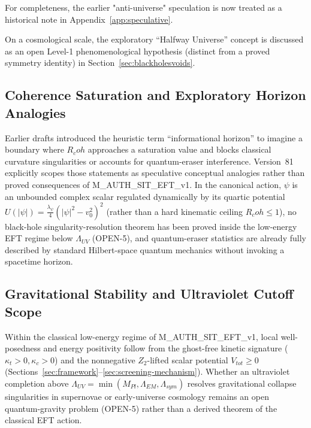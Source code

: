 \documentclass[american,11pt,letterpaper]{article}
\newcommand{\Rcoh}{R_{\mathrm{coh}}}
\def\mathrm#1{#1}%
\def\texttt#1{#1}%
\def\Rcoh{R_coh}%
\begin{document}
For completeness, the earlier "anti-universe" speculation is now treated as a historical note in Appendix~\ref{app:speculative}.

On a cosmological scale, the exploratory ``Halfway Universe'' concept is discussed as an open Level-1 phenomenological hypothesis (distinct from a proved symmetry identity) in Section~\ref{sec:blackholesvoids}.

\subsection{Coherence Saturation and Exploratory Horizon Analogies}
\label{sec:info-horizons}

Earlier drafts introduced the heuristic term ``informational horizon'' to imagine a boundary where $\Rcoh$ approaches a saturation value and blocks classical curvature singularities or accounts for quantum-eraser interference. Version~81 explicitly scopes those statements as speculative conceptual analogies rather than proved consequences of \texttt{M\_AUTH\_SIT\_EFT\_v1}. In the canonical action, $\psi$ is an unbounded complex scalar regulated dynamically by its quartic potential $U(|\psi|) = \frac{\lambda_\psi}{4}(|\psi|^2 - v_0^2)^2$ (rather than a hard kinematic ceiling $\Rcoh \le 1$), no black-hole singularity-resolution theorem has been proved inside the low-energy EFT regime below $\Lambda_{\mathrm{UV}}$ (\texttt{OPEN-5}), and quantum-eraser statistics are already fully described by standard Hilbert-space quantum mechanics without invoking a spacetime horizon.

\subsection{Gravitational Stability and Ultraviolet Cutoff Scope}
\label{sec:grav-stability}

Within the classical low-energy regime of \texttt{M\_AUTH\_SIT\_EFT\_v1}, local well-posedness and energy positivity follow from the ghost-free kinetic signature ($\kappa_t > 0, \kappa_c > 0$) and the nonnegative $Z_2$-lifted scalar potential $V_{\mathrm{tot}} \ge 0$ (Sections~\ref{sec:framework}--\ref{sec:screening-mechanism}). Whether an ultraviolet completion above $\Lambda_{\mathrm{UV}} = \min(M_{\mathrm{Pl}}, \Lambda_{\mathrm{EM}}, \Lambda_{\mathrm{sym}})$ resolves gravitational collapse singularities in supernovae or early-universe cosmology remains an open quantum-gravity problem (\texttt{OPEN-5}) rather than a derived theorem of the classical EFT action.
\end{document}
